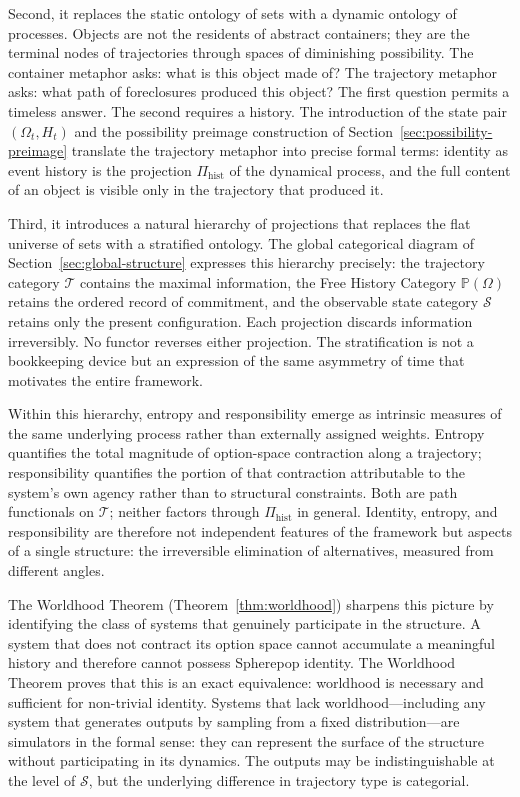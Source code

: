 \documentclass[12pt]{article}
\theoremstyle{plain}
\theoremstyle{definition}
\theoremstyle{remark}
\newcommand{\PathCat}{\mathbb{P}(\Omega)}
\begin{document}
Second, it replaces the static ontology of sets with a dynamic ontology of
processes.  Objects are not the residents of abstract containers; they are the
terminal nodes of trajectories through spaces of diminishing possibility.  The
container metaphor asks: what is this object made of?  The trajectory metaphor
asks: what path of foreclosures produced this object?  The first question
permits a timeless answer.  The second requires a history.  The introduction of
the state pair $(\Omega_t, H_t)$ and the possibility preimage construction of
Section~\ref{sec:possibility-preimage} translate the trajectory metaphor into
precise formal terms: identity as event history is the projection
$\Pi_{\mathrm{hist}}$ of the dynamical process, and the full content of an
object is visible only in the trajectory that produced it.

Third, it introduces a natural hierarchy of projections that replaces the flat
universe of sets with a stratified ontology.  The global categorical diagram of
Section~\ref{sec:global-structure} expresses this hierarchy precisely: the
trajectory category $\mathcal{T}$ contains the maximal information, the Free
History Category $\PathCat$ retains the ordered record of commitment, and the
observable state category $\mathcal{S}$ retains only the present configuration.
Each projection discards information irreversibly.  No functor reverses either
projection.  The stratification is not a bookkeeping device but an expression
of the same asymmetry of time that motivates the entire framework.

Within this hierarchy, entropy and responsibility emerge as intrinsic measures
of the same underlying process rather than externally assigned weights.  Entropy
quantifies the total magnitude of option-space contraction along a trajectory;
responsibility quantifies the portion of that contraction attributable to the
system's own agency rather than to structural constraints.  Both are path
functionals on $\mathcal{T}$; neither factors through $\Pi_{\mathrm{hist}}$
in general.  Identity, entropy, and responsibility are therefore not independent
features of the framework but aspects of a single structure: the irreversible
elimination of alternatives, measured from different angles.

The Worldhood Theorem (Theorem~\ref{thm:worldhood}) sharpens this picture by
identifying the class of systems that genuinely participate in the structure.
A system that does not contract its option space cannot accumulate a meaningful
history and therefore cannot possess Spherepop identity.  The Worldhood Theorem
proves that this is an exact equivalence: worldhood is necessary and sufficient
for non-trivial identity.  Systems that lack worldhood---including any system
that generates outputs by sampling from a fixed distribution---are simulators
in the formal sense: they can represent the surface of the structure without
participating in its dynamics.  The outputs may be indistinguishable at the level
of $\mathcal{S}$, but the underlying difference in trajectory type is categorial.
\end{document}
